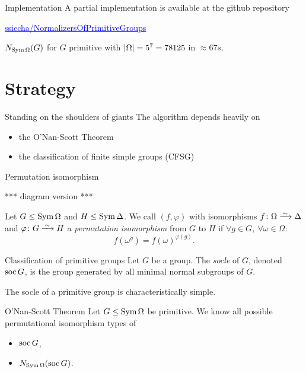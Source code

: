\documentclass{beamer}
\theoremstyle{plain}
\theoremstyle{definition}
\newcommand{\todo}[1]{{\color{red}*** #1 ***}}
\begin{document}
\begin{frame}{Implementation}
A partial implementation is available at the github repository
\begin{center}
\href{https://github.com/ssiccha/NormalizersOfPrimitiveGroups}
{\textcolor{blue}{ssiccha/NormalizersOfPrimitiveGroups}}
\end{center}
\vspace{1\baselineskip}

$N_{\operatorname{Sym} \Omega}(G)$ for $G$ primitive with $ \left| \Omega \right|  = 5 ^ 7 = 78125$ in
$\approx 67 s$.
\end{frame}


\section{Strategy}
\begin{frame}{Standing on the shoulders of giants}
The algorithm depends heavily on
\begin{itemize}
\item the O'Nan-Scott Theorem
\item the classification of finite simple groups (CFSG)
\end{itemize}
\end{frame}

\begin{frame}{Permutation isomorphism}

\todo{diagram version}

Let $G \leq \operatorname{Sym} \Omega$ and $H \leq \operatorname{Sym} \Delta$.
We call $(f, \varphi)$ with
isomorphisms
$f \from \Omega \iso \Delta$
and
$\varphi \from G \iso H$
a \emph{permutation isomorphism}
from $G$ to $H$
if
$\forall g \in G, ~ \forall \omega \in \Omega :$
\[
    f(\omega ^ g) = f(\omega) ^ {\varphi(g)}.
\]
\end{frame}


\begin{frame}{Classification of primitive groups}
Let $G$ be a group. The \emph{socle} of $G$, denoted $\operatorname{soc} G$,
is the group generated by all minimal normal subgroups of $G$.

The socle of a primitive group is characteristically simple.
\pause
\begin{block}{O'Nan-Scott Theorem}
    Let $G \leq \operatorname{Sym} \Omega$ be primitive.
    We know all possible permutational isomorphism types of
    \vspace{-0.5em}
    \begin{itemize}
        \item
        $\operatorname{soc} G$,
        \item
        $N_{\operatorname{Sym} \Omega}(\operatorname{soc} G)$.
    \end{itemize}
\end{block}
\end{frame}
\end{document}
